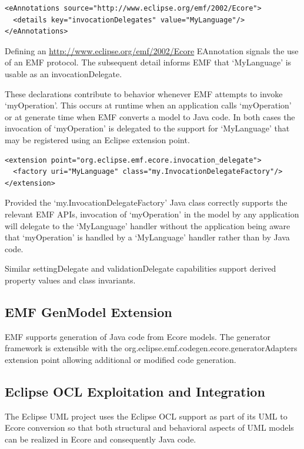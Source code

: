 \documentclass[a4paper]{article}
\begin{document}
\begin{verbatim}
<eAnnotations source="http://www.eclipse.org/emf/2002/Ecore">
  <details key="invocationDelegates" value="MyLanguage"/>
</eAnnotations>
\end{verbatim}

Defining an  \url{http://www.eclipse.org/emf/2002/Ecore} EAnnotation signals the use of an EMF protocol. The subsequent detail informs EMF that `MyLanguage' is usable as an invocationDelegate.

These declarations contribute to behavior whenever EMF attempts to invoke `myOperation'. This occurs at runtime when an application calls `myOperation' or at generate time when EMF converts a model to Java code. In both cases the invocation of `myOperation' is delegated to the support for `MyLanguage' that may be registered using an Eclipse extension point.

\begin{verbatim}
<extension point="org.eclipse.emf.ecore.invocation_delegate">
  <factory uri="MyLanguage" class="my.InvocationDelegateFactory"/>
</extension>
\end{verbatim}

Provided the `my.InvocationDelegateFactory' Java class correctly supports the relevant EMF APIs, invocation of `myOperation' in the model by any application will delegate to the `MyLanguage' handler without the application being aware that `myOperation' is handled by a `MyLanguage' handler rather than by Java code.

Similar settingDelegate and validationDelegate capabilities support derived property values and class invariants.

\subsection{EMF GenModel Extension}

EMF supports generation of Java code from Ecore models. The generator framework is extensible with the org.eclipse.emf.codegen.ecore.generatorAdapters extension point allowing additional or modified code generation.

\subsection{Eclipse OCL Exploitation and Integration}

The Eclipse UML project uses the Eclipse OCL support as part of its UML to Ecore conversion so that both structural and behavioral aspects of UML models can be realized in Ecore and consequently Java code.
\end{document}
